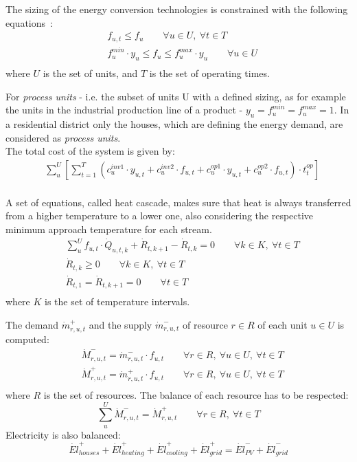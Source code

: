 \documentclass{article}
\begin{document}
The sizing of the energy conversion technologies is constrained with the following equations~\cite{suciuEnergyIntegrationCO22018}:
\begin{align}
& f_{u,t} \leq f_{u} \qquad \forall u \in U, \ \forall t \in T  \\
& f_{u}^{min} \cdot y_{u} \leq f_{u} \leq f_{u}^{max} \cdot y_{u} \qquad \forall u \in U\\
\end{align}
where $U$ is the set of units, and $T$ is the set of operating times.

For \textit{process units} - i.e. the subset of units U with a defined sizing, as for example the units in the industrial production line of a product - $y_{u} = f_{u}^{min} = f_{u}^{max} = 1$. In a residential district only the houses, which are defining the energy demand, are considered as \textit{process units}.\\

The total cost of the system is given by:
\begin{align}
& \sum_{u}^{U} \left[ \sum_{t = 1}^{T} \left( c_{u}^{inv1} \cdot y_{u,t} + c_{u}^{inv2} \cdot f_{u,t} + c_{u}^{op1} \cdot y_{u,t} + c_{u}^{op2} \cdot f_{u,t} \right) \cdot t_{t}^{op} \right] \\
\end{align}

A set of equations, called heat cascade, makes sure that heat is always transferred from a higher temperature to a lower one, also considering the respective minimum approach temperature for each stream.
\begin{align}
& \sum_{u}^{U} f_{u,t}  \cdot \dot{Q}_{u,t,k} + \dot{R}_{t,k+1} - \dot{R}_{t,k} = 0 \qquad \forall k \in K, \ \forall t \in T \\
& \dot{R}_{t,k} \geq 0 \qquad \forall k \in K, \ \forall t \in T  \\
& \dot{R}_{t,1} = \dot{R}_{t,k+1} = 0 \qquad \forall t \in T  \\
\end{align}
where $K$ is the set of temperature intervals.

The demand $\dot{m}_{r,u,t}^{+}$ and the supply $\dot{m}_{r,u,t}^{-}$ of resource $r \in R$ of each unit $u \in U$ is computed:
\begin{align}
& \dot{M}_{r,u,t}^{-} = \dot{m}_{r,u,t}^{-} \cdot f_{u,t} \qquad \forall r \in R, \ \forall u \in U, \ \forall t \in T \\
& \dot{M}_{r,u,t}^{+} = \dot{m}_{r,u,t}^{+} \cdot f_{u,t} \qquad \forall r \in R, \ \forall u \in U, \ \forall t \in T  \\
\end{align}
where $R$ is the set of resources. 
The balance of each resource has to be respected:
\begin{equation}
\sum_{u}^{U} \dot{M}_{r,u,t}^{-} = \dot{M}_{r,u,t}^{+} \qquad \forall r \in R, \ \forall t \in T
\end{equation}
Electricity is also balanced:
\begin{equation}
\dot{El}_{houses}^{+} + \dot{El}_{heating}^{+} + \dot{El}_{cooling}^{+} + \dot{El}_{grid}^{+} = \dot{El}_{PV}^{-} + \dot{El}_{grid}^{-}
\end{equation}
\end{document}
